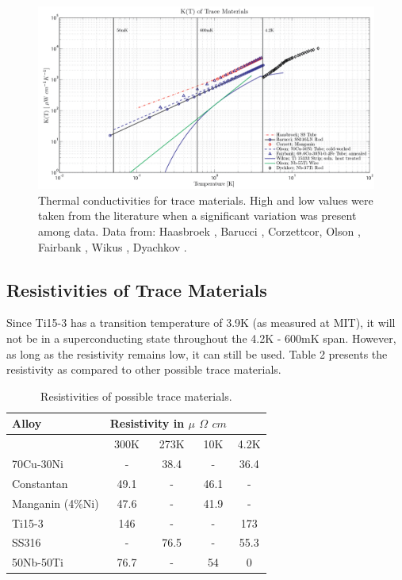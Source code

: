 \documentclass{article}
\begin{document}
\begin{figure}[h]
\centering
\includegraphics[width = .8\textwidth]{Trace_material_k.png}
\caption{Thermal conductivities for trace materials. High and low values were taken from the literature when a significant variation was present among data. Data from: Haasbroek \cite{has}, Barucci \cite{Barucci2008}, Corzett{cor}, Olson \cite{ols}, Fairbank \cite{fair}, Wikus \cite{wik}, Dyachkov \cite{dya}.}
\end{figure}


\subsection{Resistivities of Trace Materials}
Since Ti15-3 has a transition temperature of 3.9K (as measured at MIT), it will not be in a superconducting state throughout the 4.2K - 600mK span. However, as long as the resistivity remains low, it can still be used. Table 2 presents the resistivity as compared to other possible trace materials.

\begin{table}[h]
\centering
\begin{threeparttable}
\begin{tabular}{l|c|c|c|c}
Alloy & \multicolumn{3}{c}{Resistivity in $\mu$ $\Omega$ $cm$} \\\toprule
 & 300K & 273K & 10K & 4.2K \\\midrule
70Cu-30Ni & - & 38.4 & - & 36.4 \\
Constantan & 49.1 & - & 46.1 & - \\
Manganin (4\%Ni) & 47.6 & - & 41.9 & - \\
Ti15-3 & 146 & - & - & 173 \\
SS316 & - & 76.5 & - & 55.3 \\
50Nb-50Ti & 76.7 & - & 54 & 0 \\
\end{tabular}
\end{threeparttable}
\caption{Resistivities of possible trace materials.}
\end{table}
\end{document}
